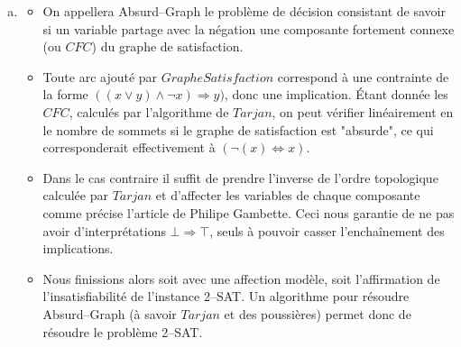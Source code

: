 \begin{enumerate}[(a)]
\item 
\begin{itemize}
\item On appellera Absurd--Graph le problème de décision consistant de savoir si un variable partage avec la négation une composante fortement connexe (ou $CFC$) du graphe de satisfaction. 
\item Toute arc ajouté par $GrapheSatisfaction$ correspond à une contrainte de la forme $((x \vee y) \wedge \neg x) \Rightarrow y)$, donc une implication. Étant donnée les $CFC$, calculés par l'algorithme de $Tarjan$, on peut vérifier linéairement en le nombre de sommets si le graphe de satisfaction est "absurde", ce qui corresponderait effectivement à $(\neg(x) \Leftrightarrow x)$.
\item Dans le cas contraire il suffit de prendre l'inverse de l'ordre topologique calculée par $Tarjan$ et d'affecter les variables de chaque composante comme précise l'article de Philipe Gambette. Ceci nous garantie de ne pas avoir d'interprétations $\bot \Rightarrow \top$, seuls à pouvoir casser l'enchaînement des implications. 
\item Nous finissions alors soit avec une affection modèle, soit l'affirmation de l'insatisfiabilité de l'instance 2--SAT. Un algorithme pour résoudre Absurd--Graph (à savoir $Tarjan$ et des poussières) permet donc de résoudre le problème 2--SAT.
\end{itemize}
\end{enumerate}




